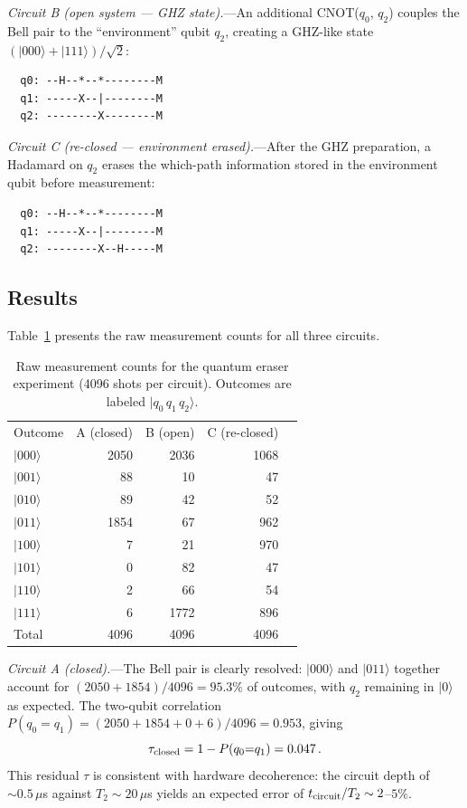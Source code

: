 \documentclass[prl,twocolumn,superscriptaddress,longbibliography,floatfix]{revtex4-2}
\newcommand{\ket}[1]{|#1\rangle}
\newcommand{\tauasym}{\tau}
\begin{document}
\textit{Circuit B (open system --- GHZ state).}---An additional
CNOT($q_0$, $q_2$) couples the Bell pair to the ``environment''
qubit $q_2$, creating a GHZ-like state
$(\ket{000}+\ket{111})/\sqrt{2}$:
\begin{verbatim}
  q0: --H--*--*--------M
  q1: -----X--|--------M
  q2: --------X--------M
\end{verbatim}

\textit{Circuit C (re-closed --- environment erased).}---After the
GHZ preparation, a Hadamard on $q_2$ erases the which-path
information stored in the environment qubit before measurement:
\begin{verbatim}
  q0: --H--*--*--------M
  q1: -----X--|--------M
  q2: --------X--H-----M
\end{verbatim}

\subsection{Results}

Table~\ref{tab:eraser_raw} presents the raw measurement counts for
all three circuits.

\begin{table}[b]
\caption{\label{tab:eraser_raw}Raw measurement counts for the
quantum eraser experiment (4096 shots per circuit). Outcomes are
labeled $\ket{q_0\,q_1\,q_2}$.}
\begin{ruledtabular}
\begin{tabular}{lrrrr}
\textrm{Outcome} & \textrm{A (closed)} & \textrm{B (open)}
  & \textrm{C (re-closed)} \\
\colrule
$\ket{000}$ & 2050 & 2036 & 1068 \\
$\ket{001}$ &   88 &   10 &   47 \\
$\ket{010}$ &   89 &   42 &   52 \\
$\ket{011}$ & 1854 &   67 &  962 \\
$\ket{100}$ &    7 &   21 &  970 \\
$\ket{101}$ &    0 &   82 &   47 \\
$\ket{110}$ &    2 &   66 &   54 \\
$\ket{111}$ &    6 & 1772 &  896 \\
\colrule
Total        & 4096 & 4096 & 4096 \\
\end{tabular}
\end{ruledtabular}
\end{table}

\textit{Circuit A (closed).}---The Bell pair is clearly resolved:
$\ket{000}$ and $\ket{011}$ together account for
$(2050+1854)/4096 = 95.3\%$ of outcomes, with $q_2$ remaining in
$\ket{0}$ as expected.  The two-qubit correlation
$P(q_0{=}q_1) = (2050+1854+0+6)/4096 = 0.953$, giving
\begin{equation}
  \tauasym_{\rm closed} = 1 - P(q_0{=}q_1) = 0.047\,.
\end{equation}
This residual $\tauasym$ is consistent with hardware decoherence:
the circuit depth of $\sim 0.5\,\mu$s against
$T_2 \sim 20\,\mu$s yields an expected error of
$t_{\rm circuit}/T_2 \sim 2$--$5\%$.
\end{document}
